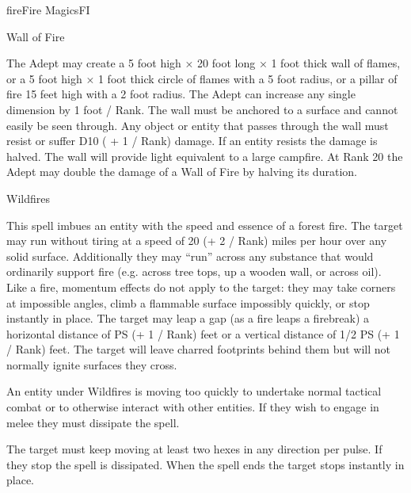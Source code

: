 \begin{College}[2.0]{fire}{Fire Magics}{FI}
\begin{spell}[S-13]{Wall of Fire}


\begin{effects}
The Adept may create a 5 foot high × 20 foot long × 1 foot thick wall
of flames, or a 5 foot high × 1 foot thick circle of flames with a 5
foot radius, or a pillar of fire 15 feet high with a 2 foot radius.
The Adept can increase any single dimension by 1 foot / Rank.  The
wall must be anchored to a surface and cannot easily be seen
through. Any object or entity that passes through the wall must resist
or suffer D10 ( + 1 / Rank) damage.  If an entity resists the damage
is halved.  The wall will provide light equivalent to a large
campfire.  At Rank 20 the Adept may double the damage of a Wall of
Fire by halving its duration.

\end{effects}
\end{spell}

\begin{spell}[S-14]{Wildfires}

\begin{effects}
This spell imbues an entity with the speed and essence of a forest
fire.  The target may run without tiring at a speed of 20 (+ 2 / Rank)
miles per hour over any solid surface.  Additionally they may “run”
across any substance that would ordinarily support fire (e.g.
across tree tops, up a wooden wall, or across oil). Like a fire,
momentum effects do not apply to the target: they may take corners at
impossible angles, climb a flammable surface impossibly quickly, or
stop instantly in place. The target may leap a gap (as a fire leaps a
firebreak) a horizontal distance of PS (+ 1 / Rank) feet or a vertical
distance of 1/2 PS (+ 1 / Rank) feet. The target will leave charred
footprints behind them but will not normally ignite surfaces they
cross.

An entity under Wildfires is moving too quickly to undertake normal
tactical combat or to otherwise interact with other entities.  If they
wish to engage in melee they must dissipate the spell.

The target must keep moving at least two hexes in any direction per
pulse.  If they stop the spell is dissipated.  When the spell ends the
target stops instantly in place.


\end{effects}
\end{spell}
\end{College}
